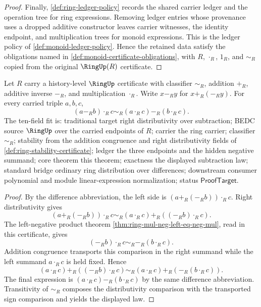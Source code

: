 \begin{proof}
Finally, \autoref{def:ring-ledger-policy} records the shared carrier ledger and the operation tree for ring expressions. Removing ledger entries whose provenance uses a dropped additive constructor leaves carrier witnesses, the identity endpoint, and multiplication trees for monoid expressions. This is the ledger policy of \autoref{def:monoid-ledger-policy}. Hence the retained data satisfy the obligations named in \autoref{def:monoid-certificate-obligations}, with $R$, $\cdot_R$, $1_R$, and $\sim_R$ copied from the original $\RingUp(R)$ certificate.
\end{proof}

\begin{theorem}
\label{thm:ring-right-distributivity-over-subtraction}
Let $R$ carry a history-level $\RingUp$ certificate with classifier $\sim_R$,
addition $+_R$, additive inverse $-_R$, and multiplication $\cdot_R$. Write
$x-_R y$ for $x+_R(-_R y)$. For every carried triple $a,b,c$,
$$
(a-_R b)\cdot_R c\sim_R(a\cdot_R c)-_R(b\cdot_R c).
$$
The ten-field fit is: traditional target right distributivity over subtraction;
BEDC source $\RingUp$ over the carried endpoints of $R$; carrier the ring
carrier; classifier $\sim_R$; stability from the addition congruence and right
distributivity fields of \autoref{def:ring-stability-certificate}; ledger the
three endpoints and the hidden negative summand; core theorem this theorem;
exactness the displayed subtraction law; standard bridge ordinary ring
distribution over differences; downstream consumer polynomial and module
linear-expression normalization; status $\mathsf{ProofTarget}$.
\end{theorem}
\begin{proof}
By the difference abbreviation, the left side is
$(a+_R(-_R b))\cdot_R c$. Right distributivity gives
$$
(a+_R(-_R b))\cdot_R c
\sim_R
(a\cdot_R c)+_R((-_R b)\cdot_R c).
$$
The left-negative product theorem
\autoref{thm:ring-mul-neg-left-eq-neg-mul}, read in this certificate, gives
$$
(-_R b)\cdot_R c\sim_R-_R(b\cdot_R c).
$$
Addition congruence transports this comparison in the right summand while the
left summand $a\cdot_R c$ is held fixed. Hence
$$
(a\cdot_R c)+_R((-_R b)\cdot_R c)
\sim_R
(a\cdot_R c)+_R(-_R(b\cdot_R c)).
$$
The final expression is $(a\cdot_R c)-_R(b\cdot_R c)$ by the same difference
abbreviation. Transitivity of $\sim_R$ composes the distributivity comparison
with the transported sign comparison and yields the displayed law.
\end{proof}

